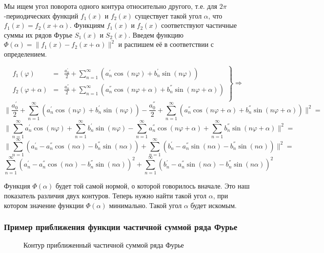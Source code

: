 \documentclass[a4paper,12pt, titlepage]{article}
\begin{document}
Мы ищем угол поворота одного контура относительно другого, т.е.  для $2\pi$-периодических 
функций $f_{1}(x)$ и $f_{2}(x)$ существует такой угол $\alpha$, что $f_{1}(x) = f_{2}(x + \alpha) $. 
Функциям $f_{1}(x)$ и $f_{2}(x)$  соответствуют частичные суммы их рядов Фурье $S_{1}(x)$ и $S_{2}(x)$. 
Введем функцию  $\Phi(\alpha)  = \| f_{1}(x) - f_{2}(x + \alpha)\|^{2}$ и распишем её в соответствии с определением.

\[
 	\left.
 		\begin{aligned}
  		{f}_{1}(\varphi) &=& \frac{{a}^{'}_{0}}{2} + \sum\limits_{n=1}^{\infty} ({a}^{'}_{n}\cos(n\varphi)+{b}^{'}_{n}\sin(n\varphi)) \\
 		{f}_{2}(\varphi + \alpha) &=& \frac{{a}^{''}_{0}}{2} + \sum\limits_{n=1}^{\infty} ({a}^{''}_{n}\cos(n\varphi+ \alpha)+{b}^{''}_{n}\sin(n\varphi+ \alpha)) \\
		\end{aligned}
	\right\rbrace	
	\Rightarrow
\]
$$\Biggl \|\frac{{a}^{'}_{0}}{2} + \sum\limits_{n=1}^{\infty} ({a}^{'}_{n}\cos(n\varphi)+{b}^{'}_{n}\sin(n\varphi)) - 
\frac{{a}^{''}_{0}}{2} + \sum\limits_{n=1}^{\infty} ({a}^{''}_{n}\cos(n\varphi+ \alpha)+{b}^{''}_{n}\sin(n\varphi+ \alpha)) \Biggr \|^{2} 
=$$
$$
\Biggl \|
\sum\limits_{n=1}^{\infty} {a}^{'}_{n}\cos(n\varphi)+ \sum\limits_{n=1}^{\infty}{b}^{'}_{n}\sin(n\varphi) - 
\sum\limits_{n=1}^{\infty} {a}^{''}_{n}\cos(n\varphi+ \alpha)+ \sum\limits_{n=1}^{\infty}{b}^{''}_{n}\sin(n\varphi+ \alpha) 
\Biggr \|^{2}
=$$
$$
\Biggl \|
\sum\limits_{n=1}^{\infty} ({a}^{'}_{n} - {a}^{''}_{n}\cos(n\alpha) - {b}^{''}_{n}\sin(n\alpha)) + 
\sum\limits_{n=1}^{\infty} ({b}^{'}_{n} - {a}^{''}_{n}\sin(n\alpha) - {b}^{''}_{n}\sin(n\alpha)) 
\Biggr \|^{2}
=$$
$$
\sum\limits_{n=1}^{\infty} ({a}^{'}_{n} - {a}^{''}_{n}\cos(n\alpha) - {b}^{''}_{n}\sin(n\alpha))^{2} + 
\sum\limits_{n=1}^{\infty} ({b}^{'}_{n} - {a}^{''}_{n}\sin(n\alpha) - {b}^{''}_{n}\sin(n\alpha))^{2} 
$$

Функция $\Phi(\alpha)$ будет той самой нормой, о которой говорилось вначале. Это наш показатель различия двух контуров. Теперь 
нужно найти такой угол $\alpha$, при котором значение функции $\Phi(\alpha)$ минимально. Такой угол $\alpha$ будет искомым.

\subsubsection{Пример приближения функции частичной суммой ряда Фурье}
\begin{figure}[h]
\noindent{}
\caption{Контур приближенный частичной суммой ряда Фурье}
\label{4k-contur-fur}
\end{figure}
\end{document}
